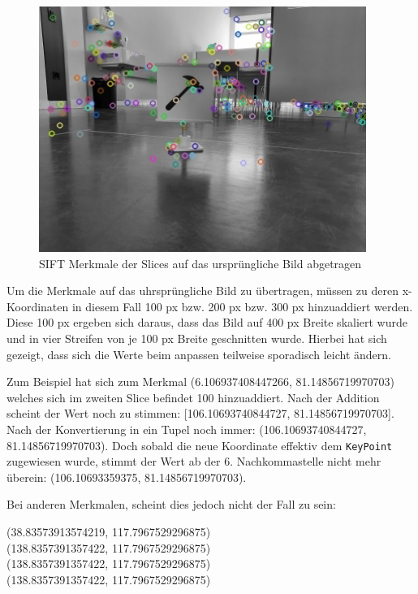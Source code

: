 \begin{figure}[H]
  \includegraphics[width=0.95\textwidth]{img/piktogrammerkennung/sift_kp2_from_slice.jpg}
  \centering
  \caption{SIFT Merkmale der Slices auf das ursprüngliche Bild abgetragen}
  \label{fig:sift-kp2-slice}
\end{figure}

Um die Merkmale auf das uhrsprüngliche Bild zu übertragen, müssen zu deren x-Koordinaten in diesem Fall 100 px bzw. 200 px bzw. 300 px hinzuaddiert werden. Diese 100 px ergeben sich daraus, dass das Bild auf 400 px Breite skaliert wurde und in vier Streifen von je 100 px Breite geschnitten wurde. Hierbei hat sich gezeigt, dass sich die Werte beim anpassen teilweise sporadisch leicht ändern. 

Zum Beispiel hat sich zum Merkmal (6.106937408447266, 81.14856719970703) welches sich im zweiten Slice befindet 100 hinzuaddiert. Nach der Addition scheint der Wert noch zu stimmen: [106.10693740844727, 81.14856719970703]. Nach der Konvertierung in ein Tupel noch immer: (106.10693740844727, 81.14856719970703). Doch sobald die neue Koordinate effektiv dem \texttt{KeyPoint} zugewiesen wurde, stimmt der Wert ab der 6. Nachkommastelle nicht mehr überein: (106.10693359375, 81.14856719970703).

Bei anderen Merkmalen, scheint dies jedoch nicht der Fall zu sein:

(38.83573913574219, 117.7967529296875)\\
(138.8357391357422, 117.7967529296875)\\
(138.8357391357422, 117.7967529296875)\\
(138.8357391357422, 117.7967529296875)\\

